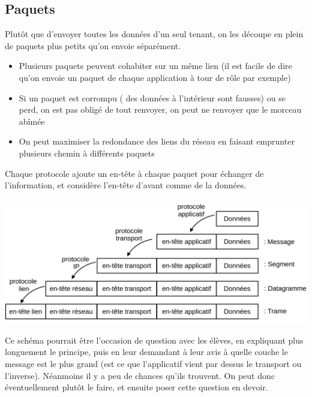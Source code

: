 \subsection{Paquets}

\begin{principe}
	Plutôt que d'envoyer toutes les données d'un seul tenant, on les découpe en plein de paquets plus petits qu'on envoie séparément.
\end{principe}

\begin{personalise}[Intérêts]
	\begin{itemize}
		\item Plusieurs paquets peuvent cohabiter sur un même lien (il est facile de dire qu'on envoie un paquet de chaque application à tour de rôle par exemple)
		
		\item Si un paquet est corrompu ( des données à l'intérieur sont fausses) ou se perd, on est pas obligé de tout renvoyer, on peut ne renvoyer que le morceau abîmée
		
		\item On peut maximiser la redondance des liens du réseau en faisant emprunter plusieurs chemin à différents paquets
	\end{itemize}
\end{personalise}

\begin{principe}
	Chaque protocole ajoute un en-tête à chaque paquet pour échanger de l'information, et considère l'en-tête d'avant comme de la données.\\
	\\
	\includegraphics[width=\linewidth]{lecon/26-architecture-internet/encapsulation.png}
\end{principe}

\begin{com}
	Ce schéma pourrait être l'occasion de question avec les élèves, en expliquant plus longuement le principe, puis en leur demandant à leur avis à quelle couche le message est le plus grand (est ce que l'applicatif vient par dessus le transport ou l'inverse). Néanmoins il y a peu de chances qu'ils trouvent. On peut donc éventuellement plutôt le faire, et ensuite poser cette question en devoir.
\end{com}

